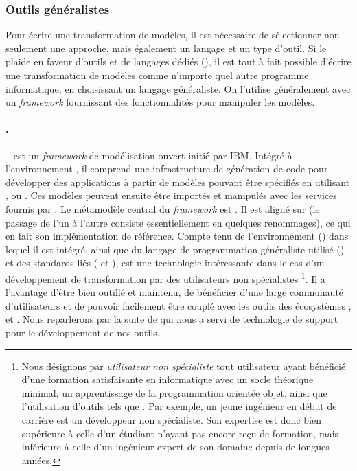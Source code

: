 \subsubsection{Outils généralistes}

Pour écrire une transformation de modèles, il est nécessaire de sélectionner
non seulement une approche, mais également un langage et un type d'outil. Si le
{\mda} plaide en faveur d'outils et de langages dédiés (\dsl), il est tout à
fait possible d'écrire une transformation de modèles comme n'importe quel autre
programme informatique, en choisissant un langage généraliste. On l'utilise
généralement avec un \emph{framework} fournissant des fonctionnalités pour
manipuler les modèles. 

\paragraph{\emf.}{\emf}~\cite{emf09} est un \emph{framework} de modélisation
ouvert initié par IBM. Intégré à l'environnement {\eclipse}, il comprend une
infrastructure de génération de code pour développer des applications à partir
de modèles pouvant être spécifiés en utilisant \uml, \xml ou \java. Ces modèles
peuvent ensuite être importés et manipulés avec les services fournis par
{\emf}. Le métamodèle central du \emph{framework} est {\ecore}. Il est aligné
sur {\emof} (le passage de l'un à l'autre consiste essentiellement en quelques
renommages), ce qui en fait son implémentation de référence. Compte tenu de
l'environnement (\eclipse) dans lequel il est intégré, ainsi que du langage de
programmation généraliste utilisé (\java) et des standards liés ({\xml} et
{\uml}), {\emf} est une technologie intéressante
dans le cas d'un développement de transformation par des utilisateurs \og non
spécialistes \fg{}\footnote{Nous désignons par \emph{utilisateur non
spécialiste} tout utilisateur ayant bénéficié d'une formation satisfaisante en
informatique avec un socle théorique minimal, un apprentissage de la
programmation orientée objet, ainsi que l'utilisation d'outils tels que
{\eclipse}. Par exemple, un jeune ingénieur en début de carrière est un
développeur non spécialiste.  Son expertise est donc bien supérieure à celle
d'un étudiant n'ayant pas encore reçu de formation, mais inférieure à celle
d'un ingénieur expert de son domaine depuis de longues années.}. Il a
l'avantage d'être bien outillé et maintenu, de bénéficier d'une large
communauté d'utilisateurs et de pouvoir facilement être couplé avec les outils
des écosystèmes \java, \uml et \xml.  Nous reparlerons par la suite de {\emf}
qui nous a servi de technologie de support pour le développement de nos outils.

